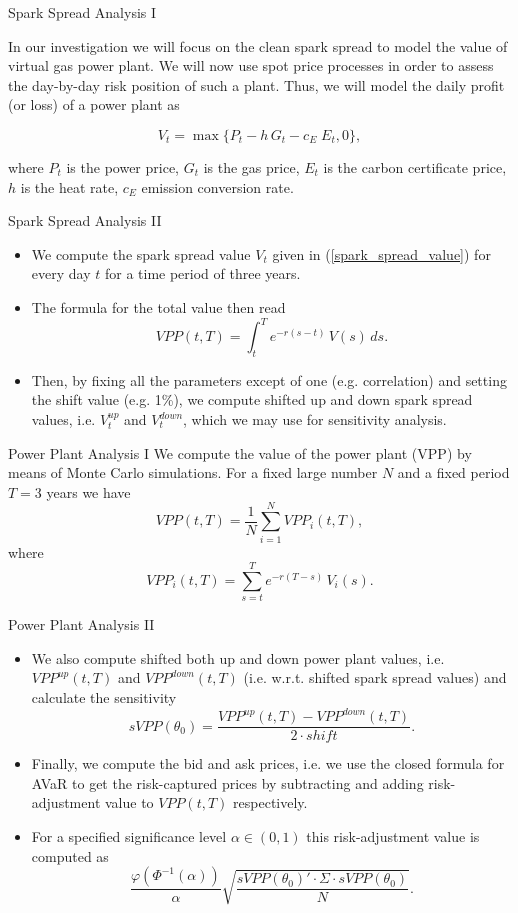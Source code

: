 {Spark Spread Analysis I}

In our investigation we will focus on the clean spark spread to model the value of virtual gas power plant. We will now use spot price processes in order to assess the day-by-day risk position of such a plant. Thus, we will model the daily profit (or loss) of a power plant as

\begin{equation}
V_t = \max\{P_t - h\,G_t - c_E\;E_t, 0\},
\label{spark_spread_value}
\end{equation}

where $P_t$ is the power price, $G_t$ is the gas price, $E_t$ is the carbon certificate price, $h$ is the heat rate, $c_E$ emission conversion rate.



{Spark Spread Analysis II}
\begin{itemize}
\item<1-> We compute the spark spread value $V_t$ given in (\ref{spark_spread_value}) for every day $t$ for a time period of three years.
\item<2->
The formula for the total value then read
$$VPP(t,T) = \int_{t}^{T}e^{-r(s-t)}\,V(s)\,ds.$$

\item<3-> Then, by fixing all the parameters except of one (e.g. correlation) and setting the shift value (e.g. 1\%), we compute shifted up and down spark spread values, i.e. $V^{up}_t$ and $V^{down}_t$, which we may use for sensitivity analysis.
\end{itemize}



{Power Plant Analysis I}
  We compute the value of the power plant (VPP) by means of Monte Carlo simulations. For a fixed large number $N$ and a fixed period $T=3$ years we have $$VPP(t,T) = \frac{1}{N}\sum_{i=1}^{N}VPP_i(t,T),$$ where $$VPP_i(t,T) = \sum_{s=t}^{T}e^{-r(T-s)}\,V_i(s).$$



{Power Plant Analysis II}
\begin{itemize}
\item<1-> We also compute shifted both up and down power plant values, i.e. $VPP^{up}(t,T)$ and $VPP^{down}(t,T)$ (i.e. w.r.t. shifted spark spread values) and calculate the sensitivity $$sVPP(\theta_0) = \frac{VPP^{up}(t,T) - VPP^{down}(t,T)}{2 \cdot shift}.$$
\item<2-> Finally, we compute the bid and ask prices, i.e. we use the closed formula for AVaR to get the risk-captured prices by subtracting and adding risk-adjustment value to $VPP(t,T)$ respectively.
\item<3-> For a specified significance level $\alpha \in (0, 1)$ this risk-adjustment value is computed as $$\frac{\varphi(\Phi^{-1}(\alpha))}{\alpha}\sqrt{\frac{sVPP(\theta_0)' \cdot \Sigma \cdot sVPP(\theta_0) }{N}}.$$
\end{itemize}





